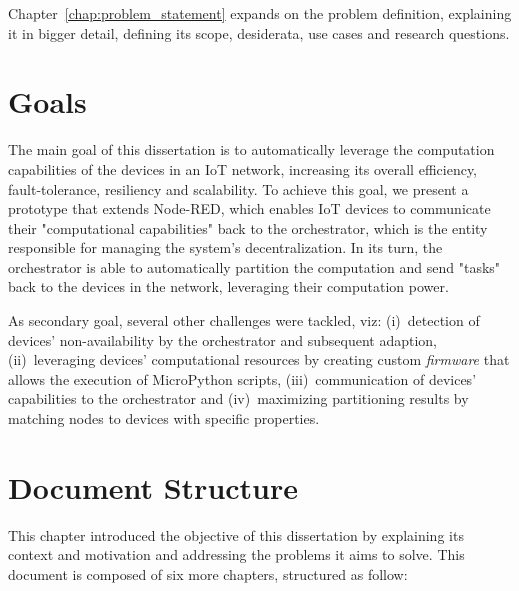 Chapter~\ref{chap:problem_statement} expands on the problem definition, explaining it in bigger detail, defining its scope, desiderata, use cases and research questions.

\section{Goals} \label{sec:goals}

The main goal of this dissertation is to automatically leverage the computation capabilities of the devices in an IoT network, increasing its overall efficiency, fault-tolerance, resiliency and scalability. To achieve this goal, we present a prototype that extends Node-RED, which enables IoT devices to communicate their "computational capabilities" back to the orchestrator, which is the entity responsible for managing the system's decentralization. In its turn, the orchestrator is able to automatically partition the computation and send "tasks" back to the devices in the network, leveraging their computation power.

As secondary goal, several other challenges were tackled, viz: (i)~detection of devices' non-availability by the orchestrator and subsequent adaption, (ii)~leveraging devices' computational resources by creating custom \textit{firmware} that allows the execution of MicroPython scripts, (iii)~communication of devices' capabilities to the orchestrator and (iv)~maximizing partitioning results by matching nodes to devices with specific properties.

\section{Document Structure} \label{sec:document structure}

This chapter introduced the objective of this dissertation by explaining its context and motivation and addressing the problems it aims to solve. This document is composed of six more chapters, structured as follow:

